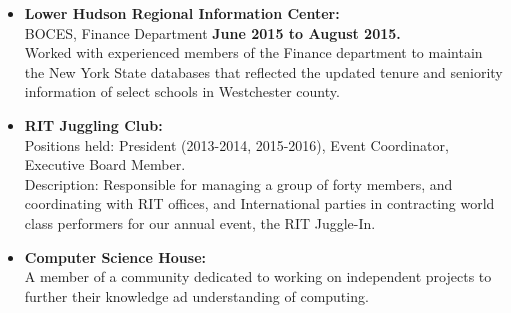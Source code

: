 \documentclass[10pt]{article}
\begin{document}
\begin{itemize}[topsep=1ex, itemsep=1ex, partopsep=0ex, parsep=0ex]
	\item[]{{\bf Lower Hudson Regional Information Center:}\\ 
	BOCES, Finance Department \hfill {\bf June 2015 to August 2015.}}\\
	Worked with experienced members of the Finance department to maintain the New York
	State databases that reflected the updated tenure and seniority information of select schools in Westchester county.
\end{itemize}
\vspace{.75ex}
\begin{itemize} [topsep=1ex, itemsep=.25ex, partopsep=0ex, parsep=1ex]
	\item[] {\bf RIT Juggling Club:}\\
	Positions held: President (2013-2014, 2015-2016), Event Coordinator, Executive Board Member.\\
	Description: Responsible for managing a group of forty members, and coordinating with RIT offices, and International parties in contracting world class performers for our annual event, the RIT Juggle-In.
	\item[] {\bf Computer Science House:}\\
	A member of a community dedicated to working on independent projects to further their knowledge ad understanding of computing.
\end{itemize}
\end{document}
